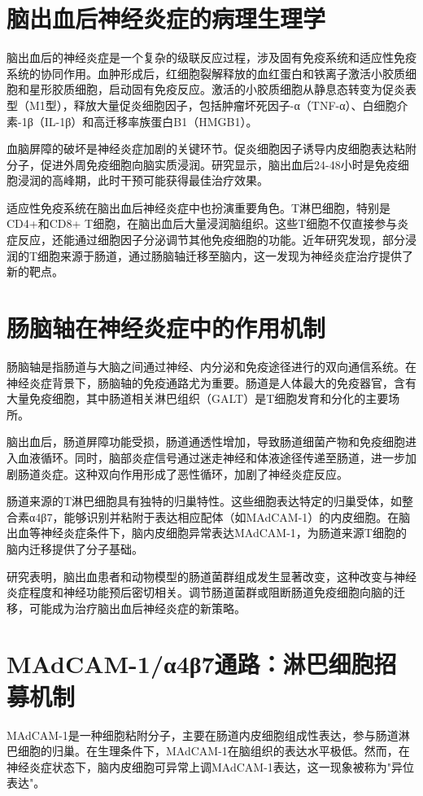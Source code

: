 \documentclass[12pt,a4paper]{article}
\begin{document}
\section{脑出血后神经炎症的病理生理学}
脑出血后的神经炎症是一个复杂的级联反应过程，涉及固有免疫系统和适应性免疫系统的协同作用。血肿形成后，红细胞裂解释放的血红蛋白和铁离子激活小胶质细胞和星形胶质细胞，启动固有免疫反应。激活的小胶质细胞从静息态转变为促炎表型（M1型），释放大量促炎细胞因子，包括肿瘤坏死因子-α（TNF-α）、白细胞介素-1β（IL-1β）和高迁移率族蛋白B1（HMGB1）。

血脑屏障的破坏是神经炎症加剧的关键环节。促炎细胞因子诱导内皮细胞表达粘附分子，促进外周免疫细胞向脑实质浸润。研究显示，脑出血后24-48小时是免疫细胞浸润的高峰期，此时干预可能获得最佳治疗效果。

适应性免疫系统在脑出血后神经炎症中也扮演重要角色。T淋巴细胞，特别是CD4+和CD8+ T细胞，在脑出血后大量浸润脑组织。这些T细胞不仅直接参与炎症反应，还能通过细胞因子分泌调节其他免疫细胞的功能。近年研究发现，部分浸润的T细胞来源于肠道，通过肠脑轴迁移至脑内，这一发现为神经炎症治疗提供了新的靶点。

\section{肠脑轴在神经炎症中的作用机制}
肠脑轴是指肠道与大脑之间通过神经、内分泌和免疫途径进行的双向通信系统。在神经炎症背景下，肠脑轴的免疫通路尤为重要。肠道是人体最大的免疫器官，含有大量免疫细胞，其中肠道相关淋巴组织（GALT）是T细胞发育和分化的主要场所。

脑出血后，肠道屏障功能受损，肠道通透性增加，导致肠道细菌产物和免疫细胞进入血液循环。同时，脑部炎症信号通过迷走神经和体液途径传递至肠道，进一步加剧肠道炎症。这种双向作用形成了恶性循环，加剧了神经炎症反应。

肠道来源的T淋巴细胞具有独特的归巢特性。这些细胞表达特定的归巢受体，如整合素α4β7，能够识别并粘附于表达相应配体（如MAdCAM-1）的内皮细胞。在脑出血等神经炎症条件下，脑内皮细胞异常表达MAdCAM-1，为肠道来源T细胞的脑内迁移提供了分子基础。

研究表明，脑出血患者和动物模型的肠道菌群组成发生显著改变，这种改变与神经炎症程度和神经功能预后密切相关。调节肠道菌群或阻断肠道免疫细胞向脑的迁移，可能成为治疗脑出血后神经炎症的新策略。

\section{MAdCAM-1/α4β7通路：淋巴细胞招募机制}
MAdCAM-1是一种细胞粘附分子，主要在肠道内皮细胞组成性表达，参与肠道淋巴细胞的归巢。在生理条件下，MAdCAM-1在脑组织的表达水平极低。然而，在神经炎症状态下，脑内皮细胞可异常上调MAdCAM-1表达，这一现象被称为"异位表达"。
\end{document}
